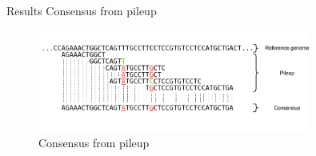 \documentclass[10pt]{beamer}
\begin{document}
\begin{frame}[fragile]{Results}
	\alert{Consensus from pileup}
	
	 {
		\begin{figure}[!htb]
			\begin{center}
				\includegraphics[width=0.8\textwidth]{imgs/consnesus.png}
				\caption{Consensus from pileup}
				\label{fg:consensus}
			\end{center}
		\end{figure}
	}
	 {
		\begin{table}[!htb]
			\caption{Consensus specification of E. Coli R9 basecalled reads}
			\label{tbl:spec_ecoli}
			\centering
			\centering \small%
		\end{table}
	}
	
\end{frame}
\end{document}
